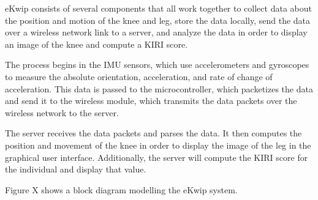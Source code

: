 eKwip consists of several components that all work together to collect data about the position and motion of the knee and leg, store the data locally, send the data over a wireless network link to a server, and analyze the data in order to display an image of the knee and compute a KIRI score.

The process begins in the IMU sensors, which use accelerometers and gyroscopes to measure the absolute orientation, acceleration, and rate of change of acceleration. This data is passed to the microcontroller, which packetizes the data and send it to the wireless module, which transmits the data packets over the wireless network to the server.

The server receives the data packets and parses the data. It then computes the position and movement of the knee in order to display the image of the leg in the graphical user interface. Additionally, the server will compute the KIRI score for the individual and display that value.

Figure X shows a block diagram modelling the eKwip system.
